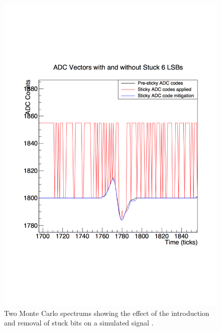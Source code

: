 \begin{figure}[h!]
\begin{minipage}{0.45\textwidth}
    \includegraphics[width=\textwidth]{StuckCodes}
  \end{minipage}
  \caption[Recovering stuck ADC codes in the 35 ton]{Two Monte Carlo spectrums showing the effect of the introduction and removal of stuck bits on a simulated signal \citep{InslerStuckCode}.}
  \label{fig:StuckCodes}
\end{figure}

